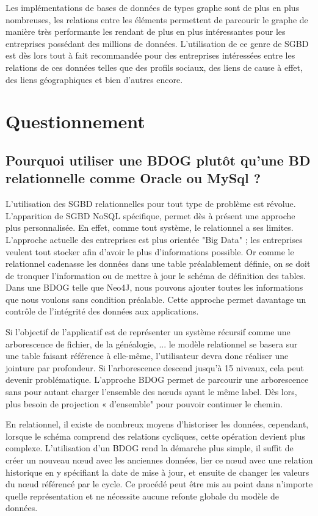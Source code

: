 \documentclass[a4paper,fleqn,12pt]{report}
\begin{document}
Les implémentations de bases de données de types graphe sont de plus en plus nombreuses, les relations entre les éléments permettent de parcourir le graphe de manière très performante les rendant de plus en plus intéressantes pour les entreprises possédant des millions de données. L'utilisation de ce genre de SGBD est dès lors tout à fait recommandée pour des entreprises intéressées entre les relations de ces données telles que des profils sociaux, des liens de cause à effet, des liens géographiques et bien d’autres encore.\cite{infoqSite}\cite{NoSqlDef}\cite{bruchez2016bases}

\section{Questionnement}

\subsection*{Pourquoi utiliser une BDOG plutôt qu'une BD relationnelle comme Oracle ou MySql ?}

L’utilisation des SGBD relationnelles pour tout type de problème est révolue. L’apparition de SGBD NoSQL spécifique, permet dès à présent une approche plus personnalisée. En effet, comme tout système, le relationnel a ses limites. L’approche actuelle des entreprises est plus orientée "Big Data" ; les entreprises veulent tout stocker afin d’avoir le plus d’informations possible. Or comme le relationnel cadenasse les données dans une table préalablement définie, on se doit de tronquer l’information ou de mettre à jour le schéma de définition des tables. Dans une BDOG telle que Neo4J, nous pouvons ajouter toutes les informations que nous voulons sans condition préalable. Cette approche permet davantage un contrôle de l’intégrité des données aux applications.

Si l’objectif de l’applicatif est de représenter un système récursif comme une arborescence de fichier, de la généalogie, ... le modèle relationnel se basera sur une table faisant référence à elle-même, l’utilisateur devra donc réaliser une jointure par profondeur. Si l’arborescence descend jusqu’à 15 niveaux, cela peut devenir problématique. L’approche BDOG permet de parcourir une arborescence sans pour autant charger l’ensemble des nœuds ayant le même label. Dès lors, plus besoin de projection « d’ensemble" pour pouvoir continuer le chemin.

En relationnel, il existe de nombreux moyens d’historiser les données, cependant, lorsque le schéma comprend des relations cycliques, cette opération devient plus complexe. L’utilisation d’un BDOG rend la démarche plus simple, il suffit de créer un nouveau nœud avec les anciennes données, lier ce nœud avec une relation historique en y spécifiant la date de mise à jour, et ensuite de changer les valeurs du nœud référencé par le cycle. Ce procédé peut être mis au point dans n’importe quelle représentation et ne nécessite aucune refonte globale du modèle de données.\cite{NoSQLVsSGBDR}\label{noSqlVSRel}
\end{document}
